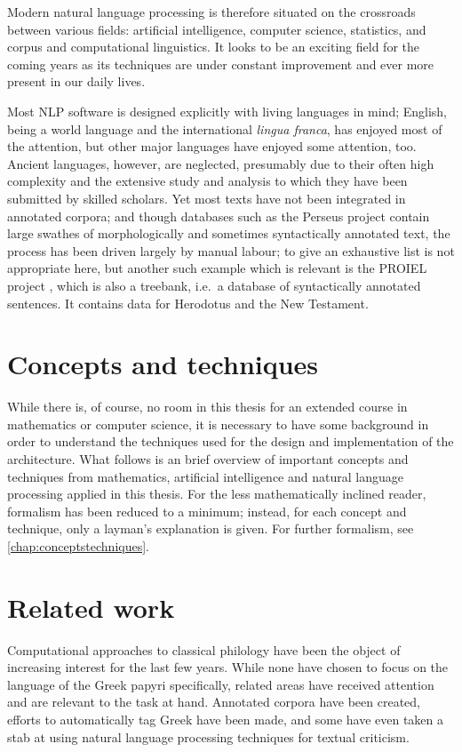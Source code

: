 Modern natural language processing is therefore situated on the
crossroads between various fields: artificial intelligence, computer
science, statistics, and corpus and computational linguistics. It
looks to be an exciting field for the coming years as its techniques
are under constant improvement and ever more present in our daily
lives.

Most NLP software is designed explicitly with living languages in
mind; English, being a world language and the international
\textit{lingua franca}, has enjoyed most of the attention, but other
major languages have enjoyed some attention, too. Ancient languages,
however, are neglected, presumably due to their often high complexity
and the extensive study and analysis to which they have been submitted
by skilled scholars. Yet most texts have not been integrated in
annotated corpora; and though databases such as the Perseus project
contain large swathes of morphologically and sometimes syntactically
annotated text, the process has been driven largely by manual labour;
to give an exhaustive list is not appropriate here, but another such
example which is relevant is the PROIEL project \citep{proiel}, which
is also a treebank, i.e.\ a database of syntactically annotated
sentences. It contains data for Herodotus and the New Testament.

\section{Concepts and techniques}


While there is, of course, no room in this thesis for an extended
course in mathematics or computer science, it is necessary to have
some background in order to understand the techniques used for the
design and implementation of the architecture. What follows is an
brief overview of important concepts and techniques from mathematics,
artificial intelligence and natural language processing applied in
this thesis. For the less mathematically inclined reader, formalism
has been reduced to a minimum; instead, for each concept and
technique, only a layman's explanation is given. For further
formalism, see \vref{chap:conceptstechniques}.

\section{Related work}

Computational approaches to classical philology have been the object
of increasing interest for the last few years. While none have chosen
to focus on the language of the Greek papyri specifically, related
areas have received attention and are relevant to the task at
hand. Annotated corpora have been created, efforts to automatically
tag Greek have been made, and some have even taken a stab at using
natural language processing techniques for textual criticism. 

